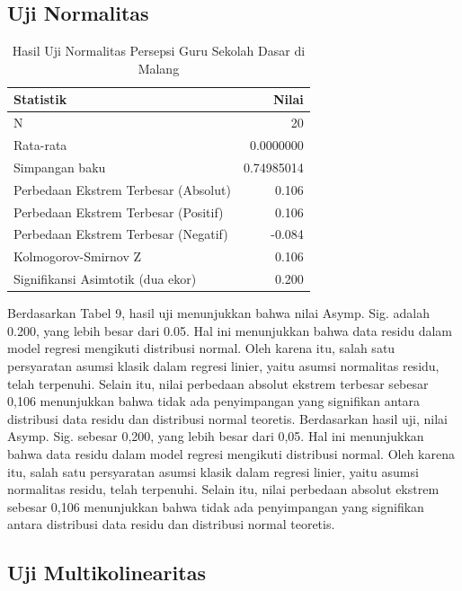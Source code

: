 \subsection{Uji Normalitas}

    \begin{table}[H]
        \centering
        \caption{Hasil Uji Normalitas Persepsi Guru Sekolah Dasar di Malang}
        \label{tab:uji-normalitas-guru}
        \begin{tabularx}{0.8\textwidth}{p{7cm}r}
            \toprule
            \textbf{Statistik} & \textbf{Nilai} \\
            \midrule
            N & 20 \\
            Rata-rata & 0.0000000 \\
            Simpangan baku & 0.74985014 \\
            Perbedaan Ekstrem Terbesar (Absolut) & 0.106 \\
            Perbedaan Ekstrem Terbesar (Positif) & 0.106 \\
            Perbedaan Ekstrem Terbesar (Negatif) & -0.084 \\
            Kolmogorov-Smirnov Z & 0.106 \\
            Signifikansi Asimtotik (dua ekor) & 0.200 \\
            \bottomrule
        \end{tabularx}
    \end{table}

    Berdasarkan Tabel 9, hasil uji menunjukkan bahwa nilai Asymp. Sig. adalah 0.200, yang lebih besar dari 0.05. Hal ini menunjukkan bahwa data residu dalam model regresi mengikuti distribusi normal. Oleh karena itu, salah satu persyaratan asumsi klasik dalam regresi linier, yaitu asumsi normalitas residu, telah terpenuhi. Selain itu, nilai perbedaan absolut ekstrem terbesar sebesar 0,106 menunjukkan bahwa tidak ada penyimpangan yang signifikan antara distribusi data residu dan distribusi normal teoretis. Berdasarkan hasil uji, nilai Asymp. Sig. sebesar 0,200, yang lebih besar dari 0,05. Hal ini menunjukkan bahwa data residu dalam model regresi mengikuti distribusi normal. Oleh karena itu, salah satu persyaratan asumsi klasik dalam regresi linier, yaitu asumsi normalitas residu, telah terpenuhi. Selain itu, nilai perbedaan absolut ekstrem sebesar 0,106 menunjukkan bahwa tidak ada penyimpangan yang signifikan antara distribusi data residu dan distribusi normal teoretis.

\subsection{Uji Multikolinearitas}

